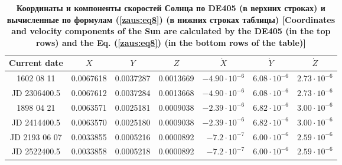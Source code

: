 \begin{table}
\center \small
\begin{minipage}[t]{160mm}
\centering
\caption{\bf Координаты и компоненты скоростей Солнца по DE405 (в верхних строках) и вычисленные по формулам  (\ref{zaus:eq8}) (в нижних строках таблицы) [Coordinates and velocity components of the Sun are calculated by the  DE405 (in the top rows) and the Eq. (\ref{zaus:eq8}) (in the bottom rows of the table)]
\vspace{-3mm}}
\begin{tabular}{|c|r|r|r|r|r|r|}
\hline
\footnotesize
\rule{0mm}{12pt}%
Current date & \multicolumn{1}{c|}{\footnotesize $X$}&	\multicolumn{1}{c|}{\footnotesize $Y$}&	\multicolumn{1}{c|}{\footnotesize $Z$}&	\multicolumn{1}{c|}{\footnotesize $\dot{X}$}&	\multicolumn{1}{c|}{\footnotesize $\dot{Y}$}&	\multicolumn{1}{c|}{\footnotesize$\dot{Z}$}\\ \hline
\rule{0mm}{14pt}%
1602 08 11&	0.0067618&	0.0037287&	0.0013669&	  $-4.90 \cdot 10^{-6}$ &	$6.08 \cdot 10^{-6}$&	   $ 2.73 \cdot 10^{-6}$\\
JD 2306400.5&	0.0067612&	0.0037284&	0.0013668&	 $ -4.90 \cdot 10^{-6}$&	$6.08 \cdot 10^{-6}$&	   $ 2.73 \cdot 10^{-6}$\\ \hline
1898 04 21&	0.0063571&	0.0025181&	0.0009038&	  $-2.39 \cdot 10^{-6}$&	$6.82 \cdot 10^{-6}$&	  $ 3.00 \cdot 10^{-6}$\\
JD 2414400.5&	0.0063570&	0.0025180&	0.0009038&	  $-2.39 \cdot 10^{-6}$&	$6.82 \cdot 10^{-6}$&	   $3.00 \cdot 10^{-6}$\\ \hline
JD 2193 06 07&	0.0033855&	0.0005216&	0.0000892&	  $-7.2 \cdot 10^{-7}$&	$6.00 \cdot 10^{-6}$ &	   $2.59 \cdot 10^{-6}$\\
JD 2522400.5&	0.0033858&	0.0005218&	0.0000892&	 $-7.2 \cdot 10^{-7}$&	$6.00 \cdot 10^{-6}$&	  $ 2.59 \cdot 10^{-6}$\\ \hline
\end{tabular}
\label{table:zausaev:tabl2}

\vspace{5mm}


\end{minipage}
\end{table}
